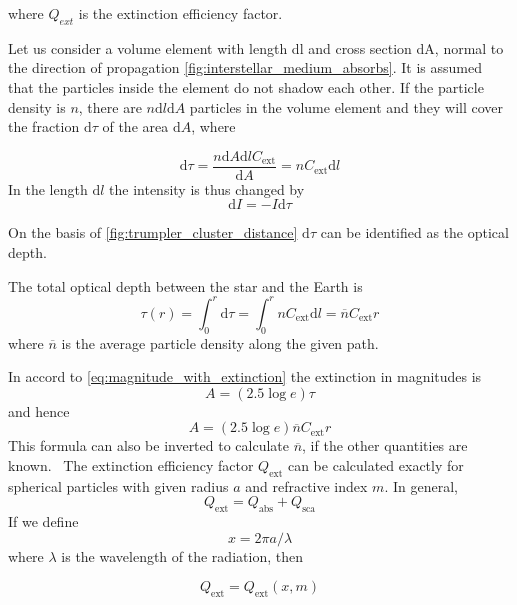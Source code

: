 \documentclass[a4paper,11pt,twoside]{book}
\newcommand{\de}[0]{\textrm{d}}
\begin{document}
where $Q_{ext}$ is the extinction efficiency factor.

Let us consider a volume element with length
dl and cross section dA, normal to the direction
of propagation \ref{fig:interstellar_medium_absorbs}. It is assumed that the particles inside the element do not shadow each
other. If the particle density is $n$, there are $n\de l \de A$
particles in the volume element and they will
cover the fraction $\de \tau$ of the area $\de A$, where

\begin{equation}
	\de \tau = \frac{n \de A \de l C_\textrm{ext}}{\de A} = n C_\textrm{ext} \de l
\end{equation}
In the length $\de l$ the intensity is thus changed by
\begin{equation}
	\de I = - I \de \tau
\end{equation}

On the basis of \ref{fig:trumpler_cluster_distance} $\de \tau$ can be identified as the
optical depth.


The total optical depth between the star and the Earth is
\begin{equation}
	\tau(r) = \int_0^r\de \tau = \int_0^r nC_\textrm{ext}\de l = \overline{n}C_\textrm{ext}r
\end{equation}
where $\overline{n}$ is the average particle density along the
given path.

In accord to  \eqref{eq:magnitude_with_extinction} the extinction in
magnitudes is
\begin{equation}
	A = (2.5\log e )\tau
\end{equation}
and hence
\begin{equation}
	A = (2.5\log e )\overline{n}C_\textrm{ext}r
\end{equation}
This formula can also be inverted to calculate $\overline{n}$,
if the other quantities are known.
\
The extinction efficiency factor $Q_{\textrm{ext}}$ can be
calculated exactly for spherical particles with
given radius $a$ and refractive index $m$. In general,
\begin{equation}
	Q_\textrm{ext} = Q_\textrm{abs} +Q_\textrm{sca}
\end{equation}
If we define
\begin{equation}
	x = 2\pi a /\lambda
\end{equation}
where $\lambda$ is the wavelength of the radiation, then

\begin{equation}
		Q_\textrm{ext} = 	Q_\textrm{ext} (x,m)
\end{equation}
\end{document}
